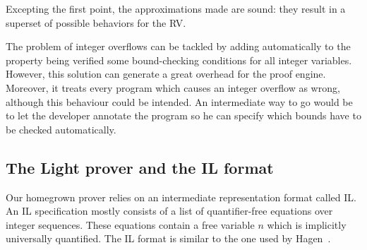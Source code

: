 Excepting the first point, the approximations made are sound: they result in a superset of possible behaviors for the RV. %

The problem of integer overflows can be tackled by adding automatically to the property being verified some bound-checking conditions for all integer variables. However, this solution can generate a great overhead for the proof engine. Moreover, it treats every program which causes an integer overflow as wrong, although this behaviour could be intended. An intermediate way to go would be to let the developer annotate the program so he can specify which bounds have to be checked automatically.

%




\subsection{The Light prover and the IL format} 

Our homegrown prover relies on an intermediate representation format called
{IL}. An IL specification mostly consists of a list of quantifier-free equations
over integer sequences. These equations contain a free variable $n$ which is
implicitly universally quantified. The IL format is similar to the one used by Hagen~\cite{HagenPhD}.


